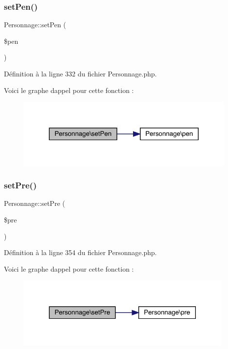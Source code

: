 \subsubsection{\texorpdfstring{set\+Pen()}{setPen()}}
{\footnotesize\ttfamily Personnage\+::set\+Pen (\begin{DoxyParamCaption}\item[{}]{\$pen }\end{DoxyParamCaption})}



Définition à la ligne 332 du fichier Personnage.\+php.

Voici le graphe d\textquotesingle{}appel pour cette fonction \+:\nopagebreak
\begin{figure}[H]
\begin{center}
\leavevmode
\includegraphics[width=309pt]{class_personnage_aeb2ef67eccbeba4a3a296895b7570359_cgraph}
\end{center}
\end{figure}
\mbox{\label{class_personnage_acf536edaa86c48b4385bd77841d5bc7c}} 
\subsubsection{\texorpdfstring{set\+Pre()}{setPre()}}
{\footnotesize\ttfamily Personnage\+::set\+Pre (\begin{DoxyParamCaption}\item[{}]{\$pre }\end{DoxyParamCaption})}



Définition à la ligne 354 du fichier Personnage.\+php.

Voici le graphe d\textquotesingle{}appel pour cette fonction \+:\nopagebreak
\begin{figure}[H]
\begin{center}
\leavevmode
\includegraphics[width=305pt]{class_personnage_acf536edaa86c48b4385bd77841d5bc7c_cgraph}
\end{center}
\end{figure}
\mbox{\label{class_personnage_ab0106674504168da06bff966c9000ffb}} 
